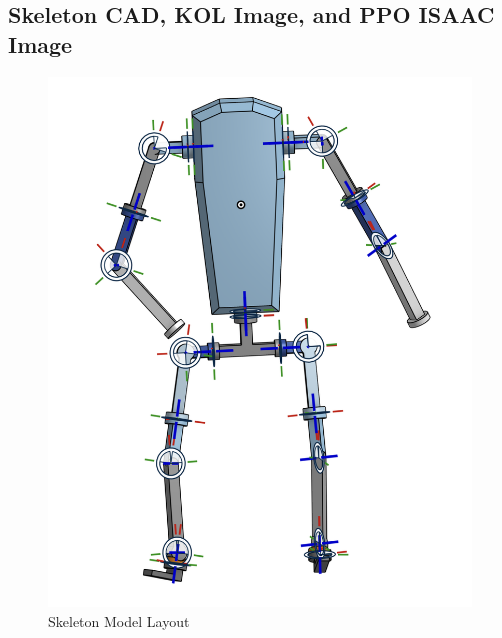 \documentclass{article}
\begin{document}
\subsection{Skeleton CAD, KOL Image, and PPO ISAAC Image}
\begin{figure}[H]
    \centering
    \includegraphics[scale=0.5]{assets/Design Presentation/Skeleton Draft.png}
    \caption{Skeleton Model Layout}
    \label{fig:enter-label}
\end{figure}
\end{document}
